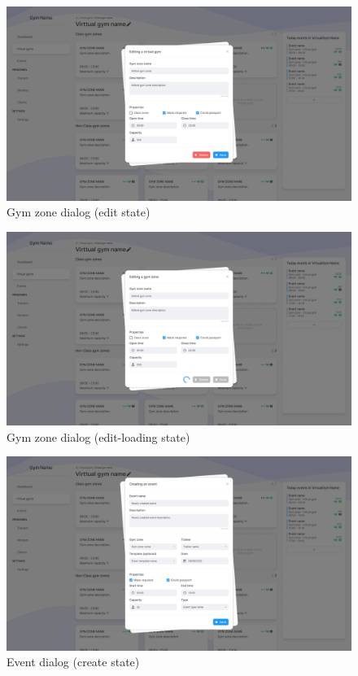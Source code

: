 \documentclass[a4paper, 12pt, oneside]{book}
\begin{document}
\begin{figure}[H]
	\centering
	\includegraphics[width=\textwidth]{assets/ui/EditGymZone.png}
	\caption{Gym zone dialog (edit state)}
\end{figure}
\begin{figure}[H]
	\centering
	\includegraphics[width=\textwidth]{assets/ui/EditLoadingGymZone.png}
	\caption{Gym zone dialog (edit-loading state)}
\end{figure}
\begin{figure}[H]
	\centering
	\includegraphics[width=\textwidth]{assets/ui/CreateEvent.png}
	\caption{Event dialog (create state)}
\end{figure}
\end{document}
